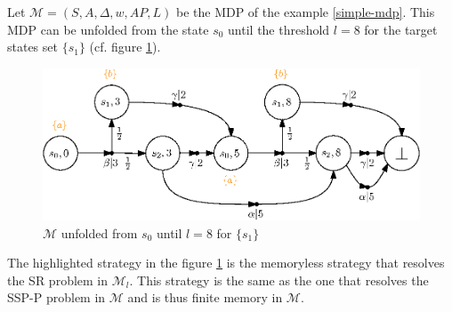 \begin{example}
  Let $\mathcal{M} = (S, A, \Delta, w, AP, L)$ be the MDP of the example \ref{simple-mdp}.
  This MDP can be unfolded from the state $s_0$ until the threshold $l = 8$ for the target states set $\{s_1\}$ (cf. figure \ref{unfolding}).
  \begin{figure}[h!]
    \centering
    \includegraphics[width=0.8\linewidth]{resources/unfolding}
    \caption{$\mathcal{M}$ unfolded from $s_0$ until $l=8$ for $\{s_1\}$}\label{unfolding}
  \end{figure}
  The highlighted strategy in the figure \ref{unfolding} is the memoryless strategy that resolves the SR problem in $\mathcal{M}_l$. This strategy is the
  same as the one that resolves the SSP-P problem in $\mathcal{M}$ and is thus finite memory in $\mathcal{M}$.
\end{example}
